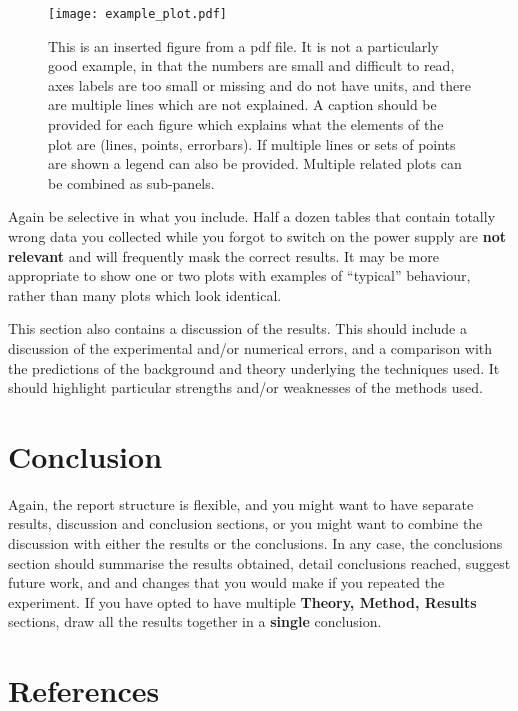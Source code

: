 \documentclass[a4paper,12pt]{article}
\begin{document}
%
%
\begin{figure}[htb]     %
        \begin{center}
        \texttt{[image: example\_plot.pdf]}
        	\end{center}
	\caption{This is an inserted figure from a pdf file. It is not a particularly good example, in that the numbers are small and difficult to read, axes labels are too small or missing and do not have units, and there are multiple lines which are not explained. A caption should be provided for each figure which explains what the elements of the plot are (lines, points, errorbars). If multiple lines or sets of points are shown a legend can also be provided. Multiple related plots can be combined as sub-panels.}
\end{figure}

Again be selective in what you include. Half a dozen
tables that contain totally wrong data you collected while you forgot
to switch on the power supply are {\bf not relevant} and will frequently
mask the correct results. It may be more appropriate to show one or two 
plots with examples of ``typical'' behaviour, rather than many plots which 
look identical.

This section also contains a discussion of the results. This should
include a discussion of the experimental and/or numerical errors, and a
comparison with the predictions of the background and theory underlying
the techniques used. It should highlight particular strengths
and/or weaknesses of the methods used.

 
\section{Conclusion}

Again, the report structure is flexible, and you might want to have separate
results, discussion and conclusion sections, or you might want to combine
the discussion with either the results or the conclusions. In any case, the 
conclusions section should summarise the results obtained, detail
conclusions reached, suggest future work, and and changes that you would make 
if you repeated the experiment. 
If you have opted to have multiple {\bf Theory, Method, Results}
sections, draw all the results together in a {\bf single} conclusion.

\section{References}
\end{document}
